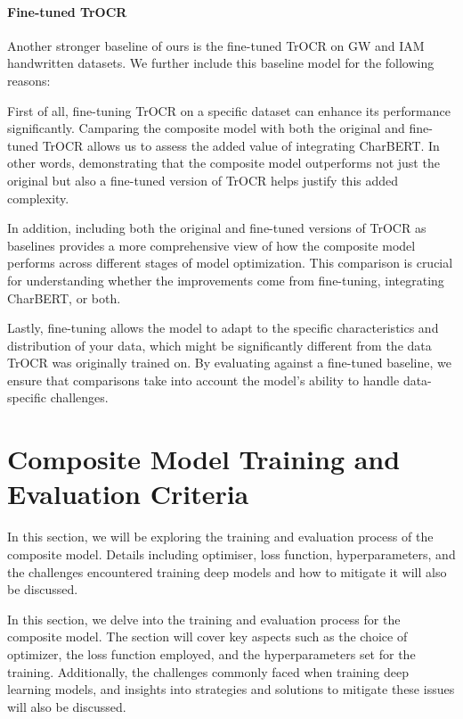 \paragraph*{Fine-tuned TrOCR}
\label{par:4_fine_tuned_trocr}
Another stronger baseline of ours is the fine-tuned TrOCR on GW and IAM handwritten datasets. We further include this baseline model for the following reasons: 

First of all, fine-tuning TrOCR on a specific dataset can enhance its performance significantly. Camparing the composite model with both the original and fine-tuned TrOCR allows us to assess the added value of integrating CharBERT. In other words, demonstrating that the composite model outperforms not just the original but also a fine-tuned version of TrOCR helps justify this added complexity. 

In addition, including both the original and fine-tuned versions of TrOCR as baselines provides a more comprehensive view of how the composite model performs across different stages of model optimization. This comparison is crucial for understanding whether the improvements come from fine-tuning, integrating CharBERT, or both. 

Lastly, fine-tuning allows the model to adapt to the specific characteristics and distribution of your data, which might be significantly different from the data TrOCR was originally trained on. By evaluating against a fine-tuned baseline, we ensure that comparisons take into account the model's ability to handle data-specific challenges.
\section{Composite Model Training and Evaluation Criteria}
\label{sec:4_model_training_and_evaluation_criteria}
In this section, we will be exploring the training and evaluation process of the composite model. Details including optimiser, loss function, hyperparameters, and the challenges encountered training deep models and how to mitigate it will also be discussed.

In this section, we delve into the training and evaluation process for the composite model. The section will cover key aspects such as the choice of optimizer, the loss function employed, and the hyperparameters set for the training. Additionally, the challenges commonly faced when training deep learning models, and insights into strategies and solutions to mitigate these issues will also be discussed.
